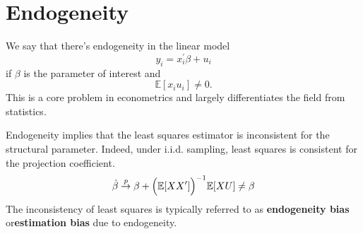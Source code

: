 \section{Endogeneity}
\label{sec:endogeneity}

We say that there's endogeneity in the linear model
\[y_i = x_i^{\prime} \beta + u_i\]
if $\beta$ is the parameter of interest and
\[\mathbb{E}[x_i u_i] \neq 0.\]
This is a core problem in econometrics and largely differentiates the field from statistics.

Endogeneity implies that the least squares estimator is inconsistent for the structural parameter.
Indeed, under i.i.d. sampling, least squares is consistent for the projection coefficient.
\begin{gather*}
    \hat{\beta} \overset{p}{\rightarrow} \beta + \Bigl(\mathbb{E}[X X^{\prime}] \Bigr)^{-1} \mathbb{E}[X U] \neq \beta 
\end{gather*}
The inconsistency of least squares is typically referred to as \textbf{endogeneity bias} or\textbf{estimation bias} due to
endogeneity.


